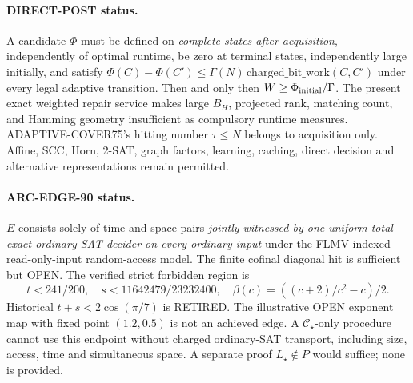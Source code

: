 \documentclass[11pt]{article}
\newcommand{\CS}{\mathcal C_\star}
\begin{document}
\paragraph{DIRECT-POST status.} A candidate $\Phi$ must be defined on \emph{complete states after acquisition}, independently of optimal runtime, be zero at terminal states, independently large initially, and satisfy $\Phi(C)-\Phi(C')\le\Gamma(N)\,\mathrm{charged\_bit\_work}(C,C')$ under every legal adaptive transition. Then and only then $W\ge\Phi_{\rm initial}/\Gamma$. The present exact weighted repair service makes large $B_H$, projected rank, matching count, and Hamming geometry insufficient as compulsory runtime measures. ADAPTIVE-COVER75's hitting number $\tau\le N$ belongs to acquisition only. Affine, SCC, Horn, 2-SAT, graph factors, learning, caching, direct decision and alternative representations remain permitted.

\paragraph{ARC-EDGE-90 status.} $E$ consists solely of time and space pairs \emph{jointly witnessed by one uniform total exact ordinary-SAT decider on every ordinary input} under the FLMV indexed read-only-input random-access model. The finite cofinal diagonal hit is sufficient but OPEN. The verified strict forbidden region is
\[
 t<241/200,\quad s<11642479/23232400,\quad
 \beta(c)=((c+2)/c^2-c)/2.
\]
Historical $t+s<2\cos(\pi/7)$ is RETIRED. The illustrative OPEN exponent map with fixed point $(1.2,0.5)$ is not an achieved edge. A $\CS$-only procedure cannot use this endpoint without charged ordinary-SAT transport, including size, access, time and simultaneous space. A separate proof $L_\star\notin P$ would suffice; none is provided.
\end{document}
